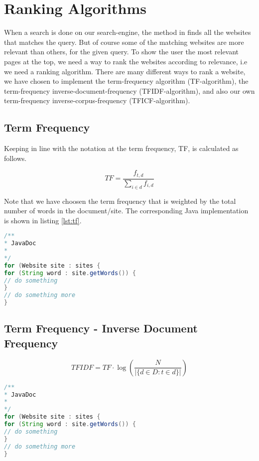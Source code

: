 \section{Ranking Algorithms}
When a search is done on our search-engine, the method  in  finds all the websites that matches the query. But of course some of the matching websites are more relevant than others, for the given query. To show the user the most relevant pages at the top, we need a way to rank the websites according to relevance, i.e we need a ranking algorithm. There are many different ways to rank a website, we have chosen to implement the term-frequency algorithm (TF-algorithm), the term-frequency inverse-document-frequency (TFIDF-algorithm), and also our own  term-frequency inverse-corpus-frequency (TFICF-algorithm).    


\subsection{Term Frequency}
Keeping in line with the notation at \cite{wikiTFIDF} the term frequency, TF, is calculated as follows.

\[ TF = \frac{f_{t,d}}{\sum_{i \in d}f_{i,d}} \]

Note that we have choosen the term frequency that is weighted by the total number of words in the document/site. The corresponding Java implementation is shown in listing \ref{lst:tf}.

\begin{lstlisting}[language=Java,
					caption={Implementation of calculating TF rating.},
					label={lst:tf}]
/**
* JavaDoc
*
*/
for (Website site : sites {
for (String word : site.getWords()) {
// do something	
}
// do something more
}

\end{lstlisting}


\subsection{Term Frequency - Inverse Document Frequency}
\[ TFIDF = TF \cdot \log{\left(\frac{N}{|\{d \in D : t \in d \}|}\right)}  \]

\begin{lstlisting}[language=Java, caption=This is a code example.]
/**
* JavaDoc
*
*/
for (Website site : sites {
for (String word : site.getWords()) {
// do something	
}
// do something more
}
\end{lstlisting}


